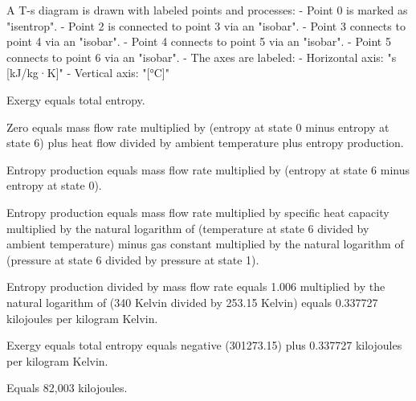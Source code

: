 A T-s diagram is drawn with labeled points and processes:  
- Point 0 is marked as "isentrop".  
- Point 2 is connected to point 3 via an "isobar".  
- Point 3 connects to point 4 via an "isobar".  
- Point 4 connects to point 5 via an "isobar".  
- Point 5 connects to point 6 via an "isobar".  
- The axes are labeled:  
  - Horizontal axis: "s [kJ/kg·K]"  
  - Vertical axis: "[°C]"

Exergy equals total entropy.  

Zero equals mass flow rate multiplied by (entropy at state 0 minus entropy at state 6) plus heat flow divided by ambient temperature plus entropy production.  

Entropy production equals mass flow rate multiplied by (entropy at state 6 minus entropy at state 0).  

Entropy production equals mass flow rate multiplied by specific heat capacity multiplied by the natural logarithm of (temperature at state 6 divided by ambient temperature) minus gas constant multiplied by the natural logarithm of (pressure at state 6 divided by pressure at state 1).  

Entropy production divided by mass flow rate equals 1.006 multiplied by the natural logarithm of (340 Kelvin divided by 253.15 Kelvin) equals 0.337727 kilojoules per kilogram Kelvin.  

Exergy equals total entropy equals negative (301273.15) plus 0.337727 kilojoules per kilogram Kelvin.  

Equals 82,003 kilojoules.